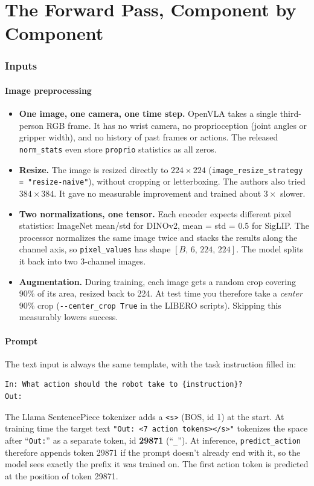 \documentclass[11pt]{article}
\begin{document}
\part{The Forward Pass, Component by Component}

\section{Inputs}

\subsection{Image preprocessing}
\begin{itemize}
  \item \textbf{One image, one camera, one time step.} OpenVLA takes a single third-person RGB frame. It has no wrist camera, no proprioception (joint angles or gripper width), and no history of past frames or actions. The released \texttt{norm\_stats} even store \texttt{proprio} statistics as all zeros.
  \item \textbf{Resize.} The image is resized directly to $224\times224$ (\texttt{image\_resize\_strategy = "resize-naive"}), without cropping or letterboxing. The authors also tried $384\times384$. It gave no measurable improvement and trained about $3\times$ slower.
  \item \textbf{Two normalizations, one tensor.} Each encoder expects different pixel statistics: ImageNet mean/std for DINOv2, mean = std = 0.5 for SigLIP. The processor normalizes the same image twice and stacks the results along the channel axis, so \texttt{pixel\_values} has shape $[B,\,6,\,224,\,224]$. The model splits it back into two 3-channel images.
  \item \textbf{Augmentation.} During training, each image gets a random crop covering 90\% of its area, resized back to 224. At test time you therefore take a \emph{center} 90\% crop (\texttt{-{}-center\_crop True} in the LIBERO scripts). Skipping this measurably lowers success.
\end{itemize}

\subsection{Prompt}
The text input is always the same template, with the task instruction filled in:
\begin{lstlisting}[language={}]
In: What action should the robot take to {instruction}?
Out:
\end{lstlisting}
The Llama SentencePiece tokenizer adds a \texttt{<s>} (BOS, id 1) at the start. At training time the target text \texttt{"Out: <7 action tokens></s>"} tokenizes the space after ``\texttt{Out:}'' as a separate token, id \textbf{29871} (``\texttt{\_}''). At inference, \texttt{predict\_action} therefore appends token 29871 if the prompt doesn't already end with it, so the model sees exactly the prefix it was trained on. The first action token is predicted at the position of token 29871.
\end{document}
